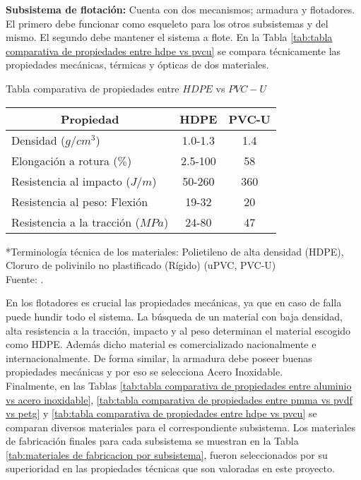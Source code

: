 
\textbf{Subsistema de flotación:} Cuenta con dos mecanismos; armadura y flotadores. El primero debe funcionar como esqueleto para los otros subsistemas y del mismo. El segundo debe mantener el sistema a flote. En la Tabla \ref{tab:tabla comparativa de propiedades entre hdpe vs pvcu} se compara técnicamente las propiedades mecánicas, térmicas y ópticas de dos materiales.

\begin{mytable}[H]
	\footnotesize\centering
	\caption{Tabla comparativa de propiedades entre $HDPE$ vs $PVC-U$}
	\label{tab:tabla comparativa de propiedades entre hdpe vs pvcu}
	\begin{tabular}{|l|c|c|}
		\hline
		\multicolumn{1}{|c|}{\textbf{Propiedad}} & \textbf{HDPE} & \textbf{PVC-U} \\ \hline
		Densidad ($g/cm^3$) & 1.0-1.3 & 1.4 \\ \hline
		Elongación a rotura ($\%$) & 2.5-100 & 58 \\ \hline
		Resistencia al impacto ($J/m$) & 50-260 & 360 \\ \hline
		Resistencia al peso: Flexión & 19-32 & 20 \\ \hline
		Resistencia a la tracción ($MPa$) & 24-80 & 47 \\ \hline
	\end{tabular}
	\begin{myflushcenteraftertable}
		*Terminología técnica de los materiales: Polietileno de alta densidad (HDPE), Cloruro de polivinilo no plastificado (Rígido) (uPVC, PVC-U)\\		
		Fuente: \cite{Brydson1999,Berins1991,Harper2000,MakeItFrom2020}.
	\end{myflushcenteraftertable}
\end{mytable}

En los flotadores es crucial las propiedades mecánicas, ya que en caso de falla puede hundir todo el sistema. La búsqueda de un material con baja densidad, alta resistencia a la tracción, impacto y al peso determinan el material escogido como HDPE. Además dicho material es comercializado nacionalmente e internacionalmente. De forma similar, la armadura debe poseer buenas propiedades mecánicas y por eso se selecciona Acero Inoxidable.\\


Finalmente, en las Tablas \ref{tab:tabla comparativa de propiedades entre aluminio vs acero inoxidable}, \ref{tab:tabla comparativa de propiedades entre pmma vs pvdf vs petg} y \ref{tab:tabla comparativa de propiedades entre hdpe vs pvcu} se comparan diversos materiales para el correspondiente subsistema. Los materiales de fabricación finales para cada subsistema se muestran en la Tabla \ref{tab:materiales de fabricacion por subsistema}, fueron seleccionados por su superioridad en las propiedades técnicas que son valoradas en este proyecto. 

